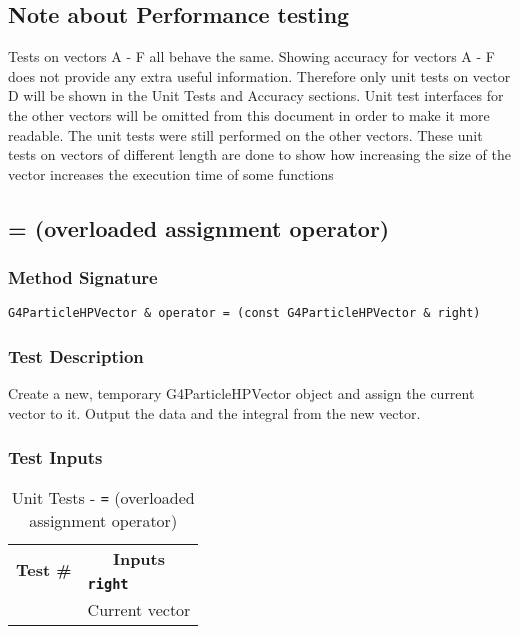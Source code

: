 \documentclass[12pt]{article}
\newcounter{TestCounter}
\begin{document}
\subsection{Note about Performance testing}
Tests on vectors A - F all behave the same. Showing accuracy for vectors A - F does not provide any extra useful information. Therefore only unit tests on vector D will be shown in the Unit Tests and Accuracy sections. Unit test interfaces for the other vectors will be omitted from this document in order to make it more readable. The unit tests were still performed on the other vectors. These unit tests on vectors of different length are done to show how  increasing the size of the vector increases the execution time of some functions

\subsection{= (overloaded assignment operator)}
	\subsubsection{Method Signature}
	\texttt{G4ParticleHPVector \& operator = (const G4ParticleHPVector \& right)}
	
	\subsubsection{Test Description}
	Create a new, temporary G4ParticleHPVector object and assign the current vector to it. Output the data and the integral from the new vector.

	\subsubsection{Test Inputs}
		\begin{table}[H]
		\centering
		\caption{Unit Tests - \texttt{=} (overloaded assignment operator)}\label{OperatorEquals_unit}
		\begin{tabular}{cl}
		\toprule
		\multirow{2}{*}{\bf Test \#}  & \multicolumn{1}{c}{\bf Inputs}\\
		& \bf \texttt{right}\\\midrule
		{TestCounter}\arabic{TestCounter}\label{OperatorEquals_0} & Current vector\\
		\bottomrule
		\end{tabular}
		\end{table}
\end{document}
